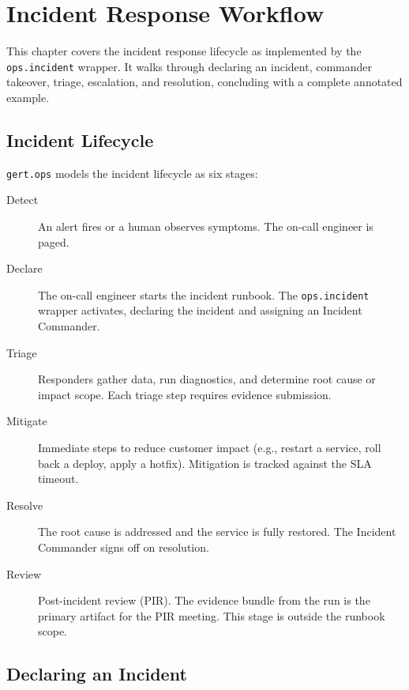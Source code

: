 \chapter{Incident Response Workflow}
\label{ch:incident-response-workflow}

This chapter covers the incident response lifecycle as implemented by the \texttt{ops.incident}
wrapper. It walks through declaring an incident, commander takeover, triage, escalation,
and resolution, concluding with a complete annotated example.

\section{Incident Lifecycle}
\label{sec:ir-lifecycle}

\texttt{gert.ops} models the incident lifecycle as six stages:

\begin{description}
  \item[Detect] An alert fires or a human observes symptoms. The on-call engineer is paged.
  \item[Declare] The on-call engineer starts the incident runbook. The \texttt{ops.incident}
    wrapper activates, declaring the incident and assigning an Incident Commander.
  \item[Triage] Responders gather data, run diagnostics, and determine root cause or impact
    scope. Each triage step requires evidence submission.
  \item[Mitigate] Immediate steps to reduce customer impact (e.g., restart a service, roll
    back a deploy, apply a hotfix). Mitigation is tracked against the SLA timeout.
  \item[Resolve] The root cause is addressed and the service is fully restored.
    The Incident Commander signs off on resolution.
  \item[Review] Post-incident review (PIR). The evidence bundle from the run is the
    primary artifact for the PIR meeting. This stage is outside the runbook scope.
\end{description}

\section{Declaring an Incident}
\label{sec:ir-declare}

